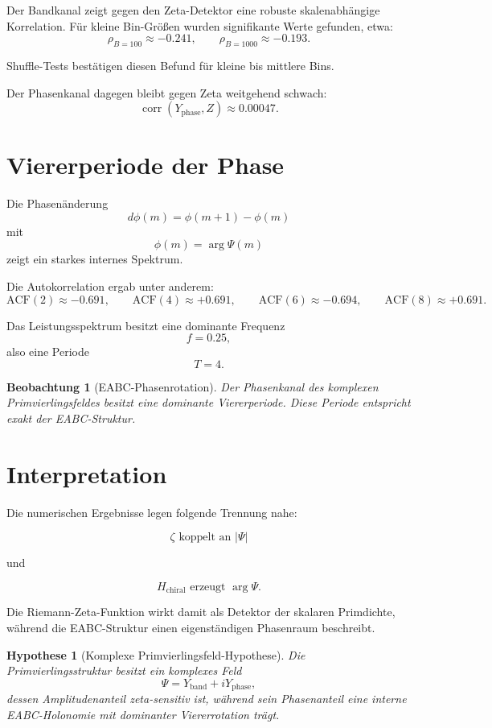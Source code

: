 \documentclass[11pt,a4paper]{article}
\newtheorem{hypothesis}{Hypothese}
\newtheorem{observation}{Beobachtung}
\begin{document}
	Der Bandkanal zeigt gegen den Zeta-Detektor eine robuste skalenabhängige Korrelation. Für kleine Bin-Größen wurden signifikante Werte gefunden, etwa:
	\[
	\rho_{B=100}\approx -0.241,
	\qquad
	\rho_{B=1000}\approx -0.193.
	\]
	
	Shuffle-Tests bestätigen diesen Befund für kleine bis mittlere Bins.
	
	Der Phasenkanal dagegen bleibt gegen Zeta weitgehend schwach:
	\[
	\operatorname{corr}(Y_{\mathrm{phase}},Z)\approx 0.00047.
	\]
	
	\section{Viererperiode der Phase}
	
	Die Phasenänderung
	\[
	d\phi(m)=\phi(m+1)-\phi(m)
	\]
	mit
	\[
	\phi(m)=\arg\Psi(m)
	\]
	zeigt ein starkes internes Spektrum.
	
	Die Autokorrelation ergab unter anderem:
	\[
	\mathrm{ACF}(2)\approx -0.691,
	\qquad
	\mathrm{ACF}(4)\approx +0.691,
	\qquad
	\mathrm{ACF}(6)\approx -0.694,
	\qquad
	\mathrm{ACF}(8)\approx +0.691.
	\]
	
	Das Leistungsspektrum besitzt eine dominante Frequenz
	\[
	f=0.25,
	\]
	also eine Periode
	\[
	T=4.
	\]
	
	\begin{observation}[EABC-Phasenrotation]
		Der Phasenkanal des komplexen Primvierlingsfeldes besitzt eine dominante Viererperiode. Diese Periode entspricht exakt der EABC-Struktur.
	\end{observation}
	
	\section{Interpretation}
	
	Die numerischen Ergebnisse legen folgende Trennung nahe:
	
	\[
	\boxed{
		\zeta \text{ koppelt an } |\Psi|
	}
	\]
	
	und
	
	\[
	\boxed{
		H_{\mathrm{chiral}} \text{ erzeugt } \arg \Psi.
	}
	\]
	
	Die Riemann-Zeta-Funktion wirkt damit als Detektor der skalaren Primdichte, während die EABC-Struktur einen eigenständigen Phasenraum beschreibt.
	
	\begin{hypothesis}[Komplexe Primvierlingsfeld-Hypothese]
		Die Primvierlingsstruktur besitzt ein komplexes Feld
		\[
		\Psi=Y_{\mathrm{band}}+iY_{\mathrm{phase}},
		\]
		dessen Amplitudenanteil zeta-sensitiv ist, während sein Phasenanteil eine interne EABC-Holonomie mit dominanter Viererrotation trägt.
	\end{hypothesis}
	
\end{document}
